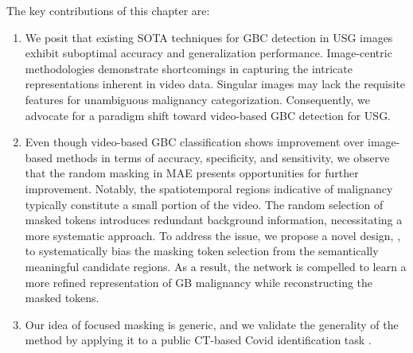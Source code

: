 %
The key contributions of this chapter are:
\begin{enumerate}[label=\textbf{(\arabic*)}]
	\item We posit that existing SOTA techniques for GBC detection in USG images exhibit suboptimal accuracy and generalization performance. Image-centric methodologies demonstrate shortcomings in capturing the intricate representations inherent in video data. Singular images may lack the requisite features for unambiguous malignancy categorization. Consequently, we advocate for a paradigm shift toward video-based GBC detection for USG. 
	\item Even though video-based GBC classification shows improvement over image-based methods in terms of accuracy, specificity, and sensitivity, we observe that the random masking in MAE presents opportunities for further improvement. Notably, the spatiotemporal regions indicative of malignancy typically constitute a small portion of the video. The random selection of masked tokens introduces redundant background information, necessitating a more systematic approach. To address the issue, we propose a novel design, \focusmae, to systematically bias the masking token selection from the semantically meaningful candidate regions. As a result, the network is compelled to learn a more refined representation of GB malignancy while reconstructing the masked tokens. %
	\item Our idea of focused masking is generic, and we validate the generality of the method by applying it to a public CT-based Covid identification task \cite{covidctmd}. %
\end{enumerate}
